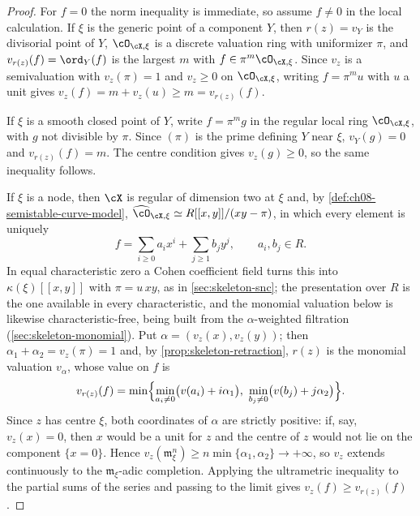 \begin{proof}
For $f=0$ the norm inequality is immediate, so assume $f\neq0$ in the
local calculation.
If $\xi$ is the generic point of a component $Y$, then $r(z)=v_Y$ is the
divisorial point of $Y$, $\cO_{\cX,\xi}$ is a discrete valuation ring with
uniformizer $\pi$, and $v_{r(z)}(f)=\ord_Y(f)$ is the largest $m$ with
$f\in\pi^m\cO_{\cX,\xi}$.  Since $v_z$ is a semivaluation with
$v_z(\pi)=1$ and $v_z\geq0$ on $\cO_{\cX,\xi}$, writing $f=\pi^mu$ with $u$ a
unit gives $v_z(f)=m+v_z(u)\geq m=v_{r(z)}(f)$.

If $\xi$ is a smooth closed point of $Y$, write $f=\pi^m g$ in the regular
local ring $\cO_{\cX,\xi}$, with $g$ not divisible by $\pi$.  Since
$(\pi)$ is the prime defining $Y$ near $\xi$, $v_Y(g)=0$ and
$v_{r(z)}(f)=m$.  The centre condition gives $v_z(g)\geq0$, so the same
inequality follows.

If $\xi$ is a node, then $\cX$ is regular of dimension two at $\xi$ and, by
\cref{def:ch08-semistable-curve-model},
$\widehat{\cO}_{\cX,\xi}\simeq R[[x,y]]/(xy-\pi)$, in which every element is
uniquely
\[
 f=\sum_{i\geq0}a_ix^i+\sum_{j\geq1}b_jy^j,
 \qquad a_i,b_j\in R .
\]
In equal characteristic zero a Cohen coefficient field turns this into
$\kappa(\xi)[[x,y]]$ with $\pi=u\,xy$, as in \cref{sec:skeleton-snc}; the
presentation over $R$ is the one available in every characteristic, and the
monomial valuation below is likewise characteristic-free, being built from
the $\alpha$-weighted filtration (\cref{sec:skeleton-monomial}).  Put
$\alpha=(v_z(x),v_z(y))$; then $\alpha_1+\alpha_2=v_z(\pi)=1$ and, by
\cref{prop:skeleton-retraction}, $r(z)$ is the monomial valuation $v_\alpha$,
whose value on $f$ is
\[
 v_{r(z)}(f)=\min\Bigl\{
   \min_{a_i\neq0}\bigl(v(a_i)+i\alpha_1\bigr),\
   \min_{b_j\neq0}\bigl(v(b_j)+j\alpha_2\bigr)\Bigr\} .
\]
Since $z$ has centre $\xi$, both coordinates of $\alpha$ are strictly
positive: if, say, $v_z(x)=0$, then $x$ would be a unit for $z$ and the
centre of $z$ would not lie on the component $\{x=0\}$.  Hence
$v_z(\mathfrak m_\xi^n)\geq n\min\{\alpha_1,\alpha_2\}\to+\infty$, so $v_z$
extends continuously to the $\mathfrak m_\xi$-adic completion.  Applying the
ultrametric inequality to the partial sums of the series and passing to the
limit gives $v_z(f)\geq v_{r(z)}(f)$.


\end{proof}
